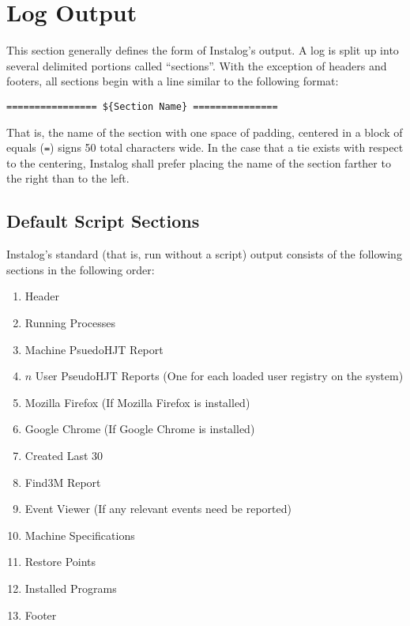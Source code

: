\section{Log Output} \label{sec:log_output}
This section generally defines the form of Instalog's output. A log is split up
into several delimited portions called ``sections''. With the exception of
headers and footers, all sections begin with a line similar to the following
format:

\begin{verbatim}
================ ${Section Name} ===============
\end{verbatim}

That is, the name of the section with one space of padding, centered in a block
of equals (\verb|=|) signs 50 total characters wide. In the case that a tie
exists with respect to the centering, Instalog shall prefer placing the name of
the section farther to the right than to the left.

\subsection{Default Script Sections} \label{sec:default_script_sections}
Instalog's standard (that is, run without a script) output consists of the
following sections in the following order:
\begin{enumerate}
    \item Header
    \item Running Processes
    \item Machine PsuedoHJT Report
    \item $n$ User PseudoHJT Reports (One for each loaded user registry on the
    system)
    \item Mozilla Firefox (If Mozilla Firefox is installed)
    \item Google Chrome (If Google Chrome is installed)
    \item Created Last 30
    \item Find3M Report
    \item Event Viewer (If any relevant events need be reported)
    \item Machine Specifications
    \item Restore Points
    \item Installed Programs
    \item Footer
\end{enumerate}


